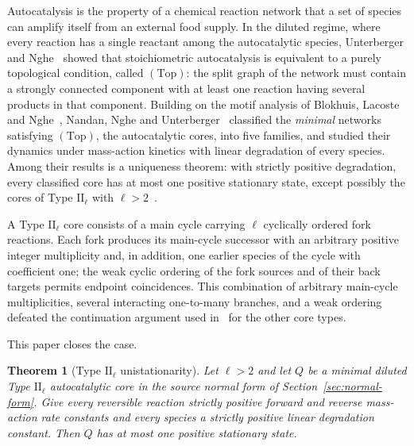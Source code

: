 \documentclass[11pt,reqno]{amsart}
\theoremstyle{plain}
\newtheorem{theorem}{Theorem}[section]
\theoremstyle{definition}
\theoremstyle{remark}
\numberwithin{equation}{section}
\newcommand{\Top}{\mathrm{(Top)}}
\begin{document}
Autocatalysis is the property of a chemical reaction network that a set of species can amplify itself from an external food supply.  In the diluted regime, where every reaction has a single reactant among the autocatalytic species, Unterberger and Nghe~\cite{UN22} showed that stoichiometric autocatalysis is equivalent to a purely topological condition, called $\Top$: the split graph of the network must contain a strongly connected component with at least one reaction having several products in that component.  Building on the motif analysis of Blokhuis, Lacoste and Nghe~\cite{BLN20}, Nandan, Nghe and Unterberger~\cite{NNU26} classified the \emph{minimal} networks satisfying $\Top$, the autocatalytic cores, into five families, and studied their dynamics under mass-action kinetics with linear degradation of every species.  Among their results is a uniqueness theorem: with strictly positive degradation, every classified core has at most one positive stationary state, except possibly the cores of Type $\mathrm{II}_\ell$ with $\ell>2$~\cite[Theorem~5.2]{NNU26}.

A Type $\mathrm{II}_\ell$ core consists of a main cycle carrying $\ell$ cyclically ordered fork reactions.  Each fork produces its main-cycle successor with an arbitrary positive integer multiplicity and, in addition, one earlier species of the cycle with coefficient one; the weak cyclic ordering of the fork sources and of their back targets permits endpoint coincidences.  This combination of arbitrary main-cycle multiplicities, several interacting one-to-many branches, and a weak ordering defeated the continuation argument used in~\cite{NNU26} for the other core types.

This paper closes the case.

\begin{theorem}[Type $\mathrm{II}_\ell$ unistationarity]\label{thm:main}
Let $\ell>2$ and let $Q$ be a minimal diluted Type $\mathrm{II}_\ell$ autocatalytic core in the source normal form of Section~\ref{sec:normal-form}.  Give every reversible reaction strictly positive forward and reverse mass-action rate constants and every species a strictly positive linear degradation constant.  Then $Q$ has at most one positive stationary state.
\end{theorem}
\end{document}
